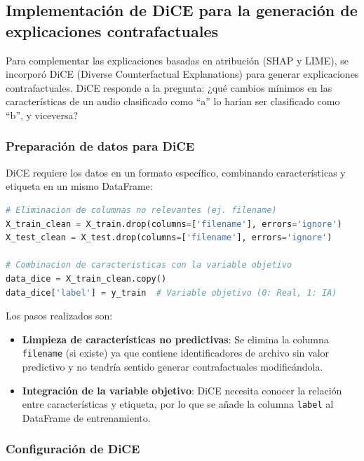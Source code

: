 \subsection*{Implementación de DiCE para la generación de explicaciones contrafactuales}

Para complementar las explicaciones basadas en atribución (SHAP y LIME), se incorporó DiCE (Diverse Counterfactual Explanations) para generar explicaciones contrafactuales. DiCE responde a la pregunta: ¿qué cambios mínimos en las características de un audio clasificado como ``a'' lo harían ser clasificado como ``b'', y viceversa?

\subsubsection*{Preparación de datos para DiCE}

DiCE requiere los datos en un formato específico, combinando características y etiqueta en un mismo DataFrame:

\begin{lstlisting}[language=Python, caption=Preparación de datos para DiCE]
# Eliminacion de columnas no relevantes (ej. filename)
X_train_clean = X_train.drop(columns=['filename'], errors='ignore')
X_test_clean = X_test.drop(columns=['filename'], errors='ignore')

# Combinacion de caracteristicas con la variable objetivo
data_dice = X_train_clean.copy()
data_dice['label'] = y_train  # Variable objetivo (0: Real, 1: IA)
\end{lstlisting}

Los pasos realizados son:

\begin{itemize}
    \item \textbf{Limpieza de características no predictivas}: Se elimina la columna \texttt{filename} (si existe) ya que contiene identificadores de archivo sin valor predictivo y no tendría sentido generar contrafactuales modificándola.
    
    \item \textbf{Integración de la variable objetivo}: DiCE necesita conocer la relación entre características y etiqueta, por lo que se añade la columna \texttt{label} al DataFrame de entrenamiento.
\end{itemize}

\subsubsection*{Configuración de DiCE}

